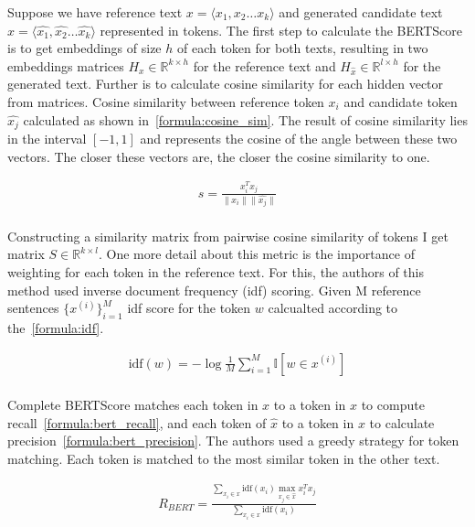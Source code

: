 Suppose we have reference text $x = \langle x_1, x_2 \dots x_k \rangle$ and generated candidate text $\hat{x} = \langle \hat{x_1}, \hat{x_2} \dots \hat{x_k} \rangle$ represented in tokens. The first step to calculate the BERTScore is to get embeddings of size $h$ of each token for both texts, resulting in two embeddings matrices $H_x \in \mathbb{R}^{k \times h}$ for the reference text and $H_{\hat{x}} \in \mathbb{R}^{l \times h}$ for the generated text. Further is to calculate cosine similarity for each hidden vector from matrices. Cosine similarity between reference token $x_i$ and candidate token $\hat{x_j}$ calculated as shown in~\ref{formula:cosine_sim}. The result of cosine similarity lies in the interval $[-1, 1]$ and represents the cosine of the angle between these two vectors. The closer these vectors are, the closer the cosine similarity to one.

\begin{align}\label{formula:cosine_sim}
    s = \frac{x_i^T x_j}{\|x_i\| \|\hat{x_j}\|}
\end{align}\\
Constructing a similarity matrix from pairwise cosine similarity of tokens I get matrix $S \in \mathbb{R}^{k \times l}$. One more detail about this metric is the importance of weighting for each token in the reference text. For this, the authors of this method used inverse document frequency (idf) scoring. Given M reference sentences $\{ x^{(i)} \}_{i=1}^M$ idf score for the token $w$ calcualted according to the~\ref{formula:idf}. 

\begin{align}\label{formula:idf}
    \text{idf}(w) = -\log \frac{1}{M} \sum_{i=1}^{M} \mathbb{I}\left[ w \in x^{(i)} \right]
\end{align}\\
Complete BERTScore matches each token in $x$ to a token in $\hat{x}$ to compute recall~\ref{formula:bert_recall}, and each token of $\hat{x}$ to a token in $x$ to calculate precision~\ref{formula:bert_precision}. The authors used a greedy strategy for token matching. Each token is matched to the most similar token in the other text. 

\begin{align}\label{formula:bert_recall}
    R_{BERT} = \frac{\sum_{x_i \in x } \text{idf}(x_i) \max_{x_j \in \hat{x}} x_i^T x_j}{\sum_{x_i \in x} \text{idf}(x_i)}
\end{align}

